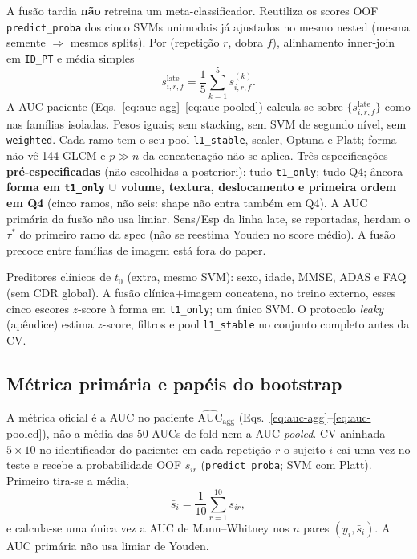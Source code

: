 \documentclass[review]{elsarticle}
\newcommand{\code}[1]{\texttt{#1}}
\begin{document}
A fusão tardia \textbf{não} retreina um meta-classificador.
Reutiliza os scores OOF \code{predict\_proba} dos cinco SVMs unimodais já ajustados no mesmo nested (mesma semente $\Rightarrow$ mesmos splits).
Por (repetição $r$, dobra $f$), alinhamento inner-join em \code{ID\_PT} e média simples
\begin{equation}
s_{i,r,f}^{\mathrm{late}}
=
\frac{1}{5}\sum_{k=1}^{5} s_{i,r,f}^{(k)}.
\label{eq:late-mean}
\end{equation}
A AUC paciente (Eqs.~\ref{eq:auc-agg}--\ref{eq:auc-pooled}) calcula-se sobre $\{s_{i,r,f}^{\mathrm{late}}\}$ como nas famílias isoladas.
Pesos iguais; sem stacking, sem SVM de segundo nível, sem \code{weighted}.
Cada ramo tem o seu pool \code{l1\_stable}, scaler, Optuna e Platt; forma não vê 144 GLCM e $p\gg n$ da concatenação não se aplica.
Três especificações \textbf{pré-especificadas} (não escolhidas a posteriori):
tudo \code{t1\_only}; tudo Q4; âncora \textbf{forma em \code{t1\_only} $\cup$ volume, textura, deslocamento e primeira ordem em Q4} (cinco ramos, não seis: shape não entra também em Q4).
A AUC primária da fusão não usa limiar.
Sens/Esp da linha late, se reportadas, herdam o $\tau^{*}$ do primeiro ramo da spec (não se reestima Youden no score médio).
A fusão precoce entre famílias de imagem está fora do paper.

Preditores clínicos de $t_0$ (extra, mesmo SVM): sexo, idade, MMSE, ADAS e FAQ (sem CDR global).
A fusão clínica$+$imagem concatena, no treino externo, esses cinco escores $z$-score à forma em \code{t1\_only}; um único SVM.
O protocolo \emph{leaky} (apêndice) estima $z$-score, filtros e pool \code{l1\_stable} no conjunto completo antes da CV.

\subsection{Métrica primária e papéis do bootstrap}
\label{sec:stats}


A métrica oficial é a AUC no paciente $\widehat{\mathrm{AUC}}_{\mathrm{agg}}$ (Eqs.~\ref{eq:auc-agg}--\ref{eq:auc-pooled}), não a média das 50 AUCs de fold nem a AUC \emph{pooled}.
CV aninhada $5\times 10$ no identificador do paciente: em cada repetição $r$ o sujeito $i$ cai uma vez no teste e recebe a probabilidade OOF $s_{ir}$ (\code{predict\_proba}; SVM com Platt).
Primeiro tira-se a média,
\[
\bar{s}_i = \frac{1}{10}\sum_{r=1}^{10} s_{ir},
\]
e calcula-se uma única vez a AUC de Mann--Whitney nos $n$ pares $(y_i,\bar{s}_i)$.
A AUC primária não usa limiar de Youden.
\end{document}
